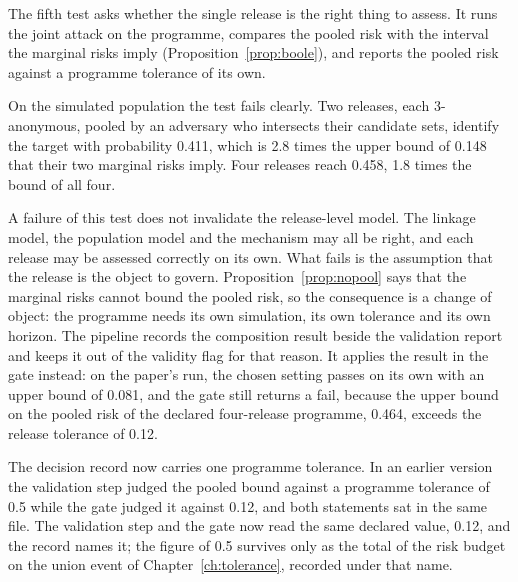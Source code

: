The fifth test asks whether the single release is the right thing to assess. It runs
the joint attack on the programme, compares the pooled risk with the interval the
marginal risks imply (Proposition~\ref{prop:boole}), and reports the pooled risk
against a programme tolerance of its own.

On the simulated population the test fails clearly. Two releases, each 3-anonymous,
pooled by an adversary who intersects their candidate sets, identify the target with
probability 0.411, which is 2.8 times the upper bound of 0.148 that their two
marginal risks imply. %
Four releases reach 0.458, 1.8 times the bound of all four.

A failure of this test does not invalidate the release-level model. The linkage
model, the population model and the mechanism may all be right, and each release may
be assessed correctly on its own. What fails is the assumption that the release is
the object to govern. Proposition~\ref{prop:nopool} says that the marginal risks
cannot bound the pooled risk, so the consequence is a change of object: the
programme needs its own simulation, its own tolerance and its own horizon. The
pipeline records the composition result beside the validation report and keeps it
out of the validity flag for that reason. %
It applies the result in the gate instead: on the paper's run, the chosen setting
passes on its own with an upper bound of 0.081, and the gate still returns a fail,
because the upper bound on the pooled risk of the declared four-release programme,
0.464, exceeds the release tolerance of 0.12. %

The decision record now carries one programme tolerance. In an earlier version the
validation step judged the pooled bound against a programme tolerance of 0.5 while the gate
judged it against 0.12, and both statements sat in the same file. The validation step and the
gate now read the same declared value, 0.12, and the record names it; the figure of 0.5
survives only as the total of the risk budget on the union event of Chapter~\ref{ch:tolerance},
recorded under that name.

